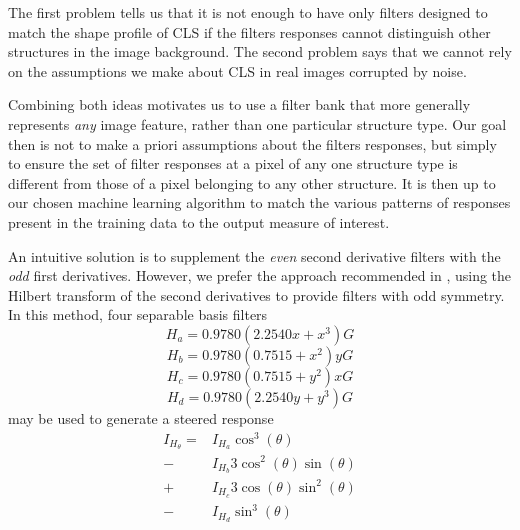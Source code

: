 \documentclass{IEEEtran}
\begin{document}
The first problem tells us that it is not enough to have only filters designed to match the shape profile of CLS if the filters responses cannot distinguish other structures in the image background. The second problem says that we cannot rely on the assumptions we make about CLS in real images corrupted by noise.

Combining both ideas motivates us to use a filter bank that more generally represents \emph{any} image feature, rather than one particular structure type. Our goal then is not to make a priori assumptions about the filters responses, but simply to ensure the set of filter responses at a pixel of any one structure type is different from those of a pixel belonging to any other structure. It is then up to our chosen machine learning algorithm to match the various patterns of responses present in the training data to the output measure of interest.

An intuitive solution is to supplement the \emph{even} second derivative filters with the \emph{odd} first derivatives. However, we prefer the approach recommended in \cite{Freeman_Adelson_TPAMI91}, using the Hilbert transform of the second derivatives to provide filters with odd symmetry. In this method, four separable basis filters
%
\begin{equation}
H_a = 0.9780(2.2540x + x^3)G
\label{e:secondderivs_hilberta}
\end{equation}
\begin{equation}
H_b = 0.9780(0.7515 + x^2)yG
\label{e:secondderivs_hilbertb}
\end{equation}
\begin{equation}
H_c = 0.9780(0.7515 + y^2)xG
\label{e:secondderivs_hilbertc}
\end{equation}
\begin{equation}
H_d = 0.9780(2.2540y + y^3)G
\label{e:secondderivs_hilbertd}
\end{equation}
%
may be used to generate a steered response
\begin{align}
   I_{H_\theta} =
     &I_{H_a} \cos^3(\theta) \nonumber \\
   - &I_{H_b} 3\cos^2(\theta)\sin(\theta) \nonumber \\
   + &I_{H_c} 3\cos(\theta)\sin^2(\theta) \nonumber \\
   - &I_{H_d} \sin^3(\theta)
\label{e:secondderivs_hilberts}
\end{align}
\end{document}
